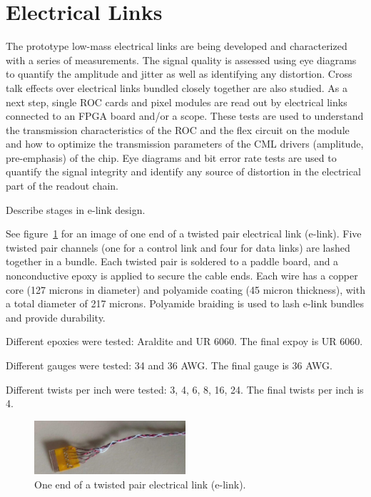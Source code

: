 \documentclass[a4paper,11pt]{article}
\begin{document}
\section{Electrical Links}
\label{sec:electrical}

The prototype low-mass electrical links are being developed and characterized with a series of measurements.
The signal quality is assessed using eye diagrams to quantify the amplitude and jitter as well as identifying any distortion.
Cross talk effects over electrical links bundled closely together are also studied.
As a next step, single ROC cards and pixel modules are read out by electrical links connected to an FPGA board and/or a scope.
These tests are used to understand the transmission characteristics of the ROC and the flex circuit on the module and how to optimize the transmission parameters of the CML drivers (amplitude, pre-emphasis) of the chip.
Eye diagrams and bit error rate tests are used to quantify the signal integrity and identify any source of distortion in the electrical part of the readout chain.


Describe stages in e-link design.

See figure~\ref{fig:elink} for an image of one end of a twisted pair electrical link (e-link).
Five twisted pair channels (one for a control link and four for data links) are lashed together in a bundle.
Each twisted pair is soldered to a paddle board, and a nonconductive epoxy is applied to secure the cable ends.
Each wire has a copper core (127 microns in diameter) and polyamide coating (45 micron thickness), with a total diameter of 217 microns.
Polyamide braiding is used to lash e-link bundles and provide durability.

Different epoxies were tested: Araldite and UR 6060.
The final expoy is UR 6060.

Different gauges were tested: 34 and 36 AWG.
The final gauge is 36 AWG.

Different twists per inch were tested: 3, 4, 6, 8, 16, 24.
The final twists per inch is 4.

\begin{figure}[htbp]
\centering
\includegraphics[width=0.5\textwidth,origin=c]{../figures/e-link-1.jpg}
\caption{
\label{fig:elink}
One end of a twisted pair electrical link (e-link).
}
\end{figure}
\end{document}

